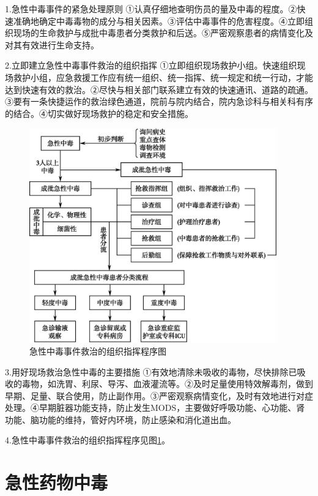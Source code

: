1.急性中毒事件的紧急处理原则
①认真仔细地查明伤员的量及中毒的程度。②快速准确地确定中毒毒物的成分与相关因素。③评估中毒事件的危害程度。④立即组织现场的生命救护与成批中毒患者分类救护和后送。⑤严密观察患者的病情变化及对其有效进行生命支持。

2.立即建立急性中毒事件救治的组织指挥
①立即组织现场救护小组。快速组织现场救护小组，应急救援工作应有统一组织、统一指挥、统一规定和统一行动，才能达到快速有效的救治。②尽快与相关部门联系建立有效的快速通讯、道路的疏通。③要有一条快捷运作的救治绿色通道，院前与院内结合，院内急诊科与相关科有序的结合。④切实做好现场救护的稳定和安全措施。

\begin{figure}[!htbp]
 \centering
 \includegraphics[width=4.20833in,height=3.64583in]{./images/Image00181.jpg}
 \captionsetup{justification=centering}
 \caption{急性中毒事件救治的组织指挥程序图}
 \label{fig53-1}
  \end{figure} 

3.用好现场救治急性中毒的主要措施
①有效地清除未吸收的毒物，尽快排除已吸收的毒物，如洗胃、利尿、导泻、血液灌流等。②及时足量使用特效解毒剂，做到早期、足量、联合使用，防止副作用。③严密观察病情变化，及时有效地进行对症处理。④早期脏器功能支持，防止发生MODS，主要做好呼吸功能、心功能、肾功能、脑功能的维持，管好内环境，防止感染和消化道出血。

4.急性中毒事件救治的组织指挥程序见图\ref{fig53-1}。

\protect\hypertarget{text00131.html}{}{}

\chapter{急性药物中毒}

